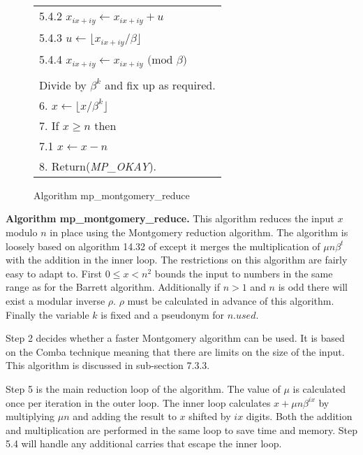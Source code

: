 \documentclass[b5paper]{book}
\begin{document}
\begin{figure}[!here]
\begin{small}
\begin{center}
\begin{tabular}{l}
\hspace{6mm}5.4.2  $x_{ix + iy} \leftarrow x_{ix + iy} + u$ \\
\hspace{6mm}5.4.3  $u \leftarrow \lfloor x_{ix+iy} / \beta \rfloor$ \\
\hspace{6mm}5.4.4  $x_{ix + iy} \leftarrow x_{ix+iy} \mbox{ (mod }\beta\mbox{)}$ \\
\\
Divide by $\beta^k$ and fix up as required. \\
6.  $x \leftarrow \lfloor x / \beta^k \rfloor$ \\
7.  If $x \ge n$ then \\
\hspace{3mm}7.1  $x \leftarrow x - n$ \\
8.  Return(\textit{MP\_OKAY}). \\
\hline
\end{tabular}
\end{center}
\end{small}
\caption{Algorithm mp\_montgomery\_reduce}
\end{figure}

\textbf{Algorithm mp\_montgomery\_reduce.}
This algorithm reduces the input $x$ modulo $n$ in place using the Montgomery reduction algorithm.  The algorithm is loosely based
on algorithm 14.32 of \cite[pp.601]{HAC} except it merges the multiplication of $\mu n \beta^t$ with the addition in the inner loop.  The
restrictions on this algorithm are fairly easy to adapt to.  First $0 \le x < n^2$ bounds the input to numbers in the same range as 
for the Barrett algorithm.  Additionally if $n > 1$ and $n$ is odd there will exist a modular inverse $\rho$.  $\rho$ must be calculated in
advance of this algorithm.  Finally the variable $k$ is fixed and a pseudonym for $n.used$.  

Step 2 decides whether a faster Montgomery algorithm can be used.  It is based on the Comba technique meaning that there are limits on
the size of the input.  This algorithm is discussed in sub-section 7.3.3.

Step 5 is the main reduction loop of the algorithm.  The value of $\mu$ is calculated once per iteration in the outer loop.  The inner loop
calculates $x + \mu n \beta^{ix}$ by multiplying $\mu n$ and adding the result to $x$ shifted by $ix$ digits.  Both the addition and
multiplication are performed in the same loop to save time and memory.  Step 5.4 will handle any additional carries that escape the inner loop.
\end{document}
